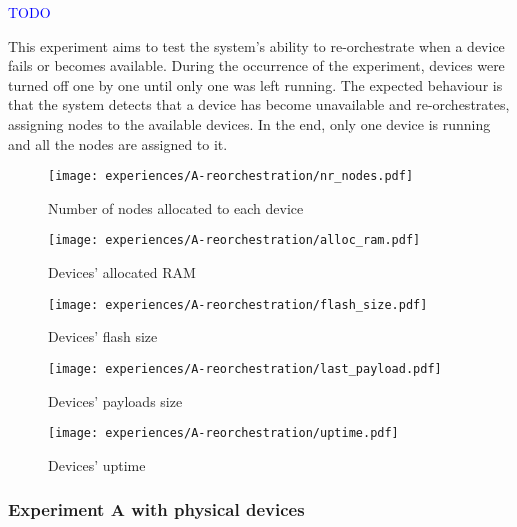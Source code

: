 \textcolor{blue}{TODO}

This experiment aims to test the system's ability to re-orchestrate when a device fails or becomes available. During the occurrence of the experiment, devices were turned off one by one until only one was left running. The expected behaviour is that the system detects that a device has become unavailable and re-orchestrates, assigning nodes to the available devices. In the end, only one device is running and all the nodes are assigned to it.

\begin{figure}[h]
\centering
\texttt{[image: experiences/A-reorchestration/nr\_nodes.pdf]}
\caption[Number of nodes allocated to each device]{Number of nodes allocated to each device}\label{fig:reorchestration_nr_nodes}
\end{figure}
    
\begin{figure}[h]
\centering
\texttt{[image: experiences/A-reorchestration/alloc\_ram.pdf]}
\caption[Devices' allocated RAM]{Devices' allocated RAM}\label{fig:reorchestration_alloc_ram}
\end{figure}

\begin{figure}[h]
\centering
\texttt{[image: experiences/A-reorchestration/flash\_size.pdf]}
\caption[Devices' flash size]{Devices' flash size}\label{fig:reorchestration_flash_size}
\end{figure}

\begin{figure}[h]
\centering
\texttt{[image: experiences/A-reorchestration/last\_payload.pdf]}
\caption[Devices' payloads size]{Devices' payloads size}\label{fig:reorchestration_last_payload}
\end{figure}

\begin{figure}[h]
\centering
\texttt{[image: experiences/A-reorchestration/uptime.pdf]}
\caption[Devices' uptime]{Devices' uptime}\label{fig:reorchestration_uptime}
\end{figure}


\subsubsection{Experiment A with physical devices}

